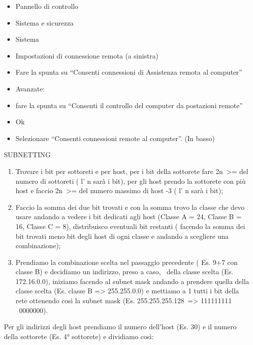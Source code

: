 \documentclass[
]{article}
\providecommand{\tightlist}{%
  \setlength{\itemsep}{0pt}\setlength{\parskip}{0pt}}
\begin{document}
\begin{itemize}
\tightlist
\item
  {Pannello di controllo}
\item
  {Sistema e sicurezza}
\item
  {Sistema}
\item
  {Impostazioni di connessione remota (a sinistra)}
\item
  {Fare la spunta su ``Consenti connessioni di Assistenza remota al
  computer''}
\item
  {Avanzate:}
\item
  {fare la spunta su ``Consenti il controllo del computer da postazioni
  remote''}
\item
  {Ok}
\item
  {Selezionare ``Consenti connessioni remote al computer''. (In basso)}
\end{itemize}

{}

{}

{}

{SUBNETTING}

{}

\begin{enumerate}
\tightlist
\item
  {Trovare i bit per sottoreti e per host, per i bit della sottorete
  fare 2}{n}{~\textgreater= del numero di sottoreti ( l' n sarà i bit),
  per gli host prendo la sottorete con più host e faccio
  2}{n}{~\textgreater= del numero massimo di host -3 ( l' n sarà i
  bit);}
\item
  {Faccio la somma dei due bit trovati e con la somma trovo la classe
  che devo usare andando a vedere i bit dedicati agli host (Classe A =
  24, Classe B = 16, Classe C = 8), distribuisco eventuali bit restanti
  ( facendo la somma dei bit trovati meno bit degli host di ogni classe
  e andando a scegliere una combinazione);}
\item
  {Prendiamo la combinazione scelta nel passaggio precedente ( Es. 9+7
  con classe B) e decidiamo un indirizzo, preso a caso, ~della classe
  scelta (Es. 172.16.0.0), iniziamo facendo al subnet mask andando a
  prendere quella della classe scelta (Es. classe B =\textgreater{}
  255.255.0.0) e mettiamo a 1 tutti i bit della rete ottenendo così la
  subnet mask (Es. 255.255.}{255}{.}{128}{~=\textgreater{} }{11111111}{1
  }{\textbar{}}{~0000000}{).}
\end{enumerate}

{}

{Per gli indirizzi degli host prendiamo il numero dell'host (Es. 30) e
il numero della sottorete (Es. 4° sottorete) e dividiamo così:}
\end{document}
